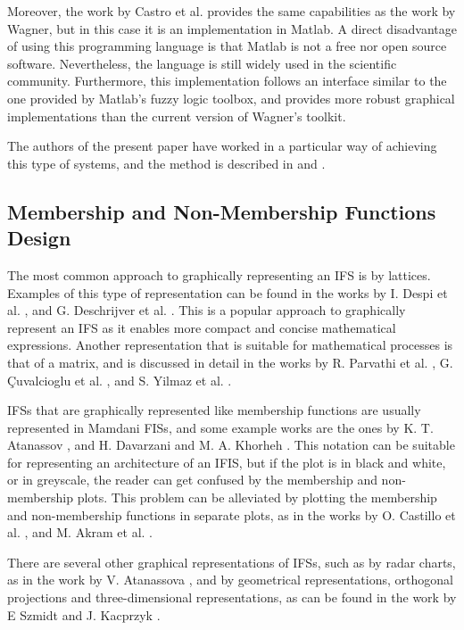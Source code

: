 Moreover, the work by Castro et al. \cite{castro2007interval} provides the same
capabilities as the work by Wagner, but in this case it is an implementation in
Matlab. A direct disadvantage of using this programming language is that Matlab
is not a free nor open source software.  Nevertheless, the language is still
widely used in the scientific community. Furthermore, this implementation
follows an interface similar to the one provided by Matlab's fuzzy logic
toolbox, and provides more robust graphical implementations than the current
version of Wagner's toolkit.

The authors of the present paper have worked in a particular way of achieving
this type of systems, and the method is described in \cite{Hernandez-Aguila2016}
and \cite{Hernandez-Aguila2017-2}.

\subsection{Membership and Non-Membership Functions Design}
\label{subsection:related-work-membership-and-non-membership-functions-design}

The most common approach to graphically representing an IFS is by
lattices. Examples of this type of representation can be found in the works by
I. Despi et al. \cite{Despi2013}, and G. Deschrijver et
al. \cite{Deschrijver2004}. This is a popular approach to graphically represent
an IFS as it enables more compact and concise mathematical expressions. Another
representation that is suitable for mathematical processes is that of a matrix,
and is discussed in detail in the works by R. Parvathi et al. \cite{Parvathi2014},
G. Çuvalcioglu et al. \cite{Yilmaz2015}, and S. Yilmaz et al. \cite{Yilmaz2015a}.

IFSs that are graphically represented like membership functions are usually
represented in Mamdani FISs, and some example works are the ones by
K. T. Atanassov \cite{Atanassov1986}, and H. Davarzani and M. A. Khorheh
\cite{Davarzani2013}. This notation can be suitable for representing an
architecture of an IFIS, but if the plot is in black and white, or in greyscale,
the reader can get confused by the membership and non-membership plots. This
problem can be alleviated by plotting the membership and non-membership
functions in separate plots, as in the works by O. Castillo et
al. \cite{castillo2007intuitionistic}, and M. Akram et al. \cite{Akram2014}.

There are several other graphical representations of IFSs, such as by radar
charts, as in the work by V. Atanassova \cite{Atanassova2010}, and by
geometrical representations, orthogonal projections and three-dimensional
representations, as can be found in the work by E Szmidt and J. Kacprzyk
\cite{Szmidt2000}.

